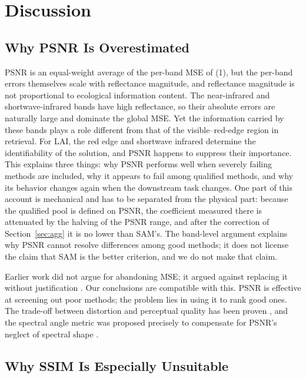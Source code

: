 \documentclass[a4paper,fleqn]{cas-dc}
\begin{document}
\section{Discussion}

\subsection{Why PSNR Is Overestimated}

PSNR is an equal-weight average of the per-band MSE of (1), but the per-band errors themselves scale with reflectance magnitude, and reflectance magnitude is not proportional to ecological information content. The near-infrared and shortwave-infrared bands have high reflectance, so their absolute errors are naturally large and dominate the global MSE. Yet the information carried by these bands plays a role different from that of the visible--red-edge region in retrieval. For LAI, the red edge and shortwave infrared determine the identifiability of the solution, and PSNR happens to suppress their importance. This explains three things: why PSNR performs well when severely failing methods are included, why it appears to fail among qualified methods, and why its behavior changes again when the downstream task changes. One part of this account is mechanical and has to be separated from the physical part: because the qualified pool is defined on PSNR, the coefficient measured there is attenuated by the halving of the PSNR range, and after the correction of Section~\ref{sec:agg} it is no lower than SAM's. The band-level argument explains why PSNR cannot resolve differences among good methods; it does not license the claim that SAM is the better criterion, and we do not make that claim.

Earlier work did not argue for abandoning MSE; it argued against replacing it without justification \cite{ref3}. Our conclusions are compatible with this. PSNR is effective at screening out poor methods; the problem lies in using it to rank good ones. The trade-off between distortion and perceptual quality has been proven \cite{ref33}, and the spectral angle metric was proposed precisely to compensate for PSNR's neglect of spectral shape \cite{ref9}.

\subsection{Why SSIM Is Especially Unsuitable}
\end{document}
